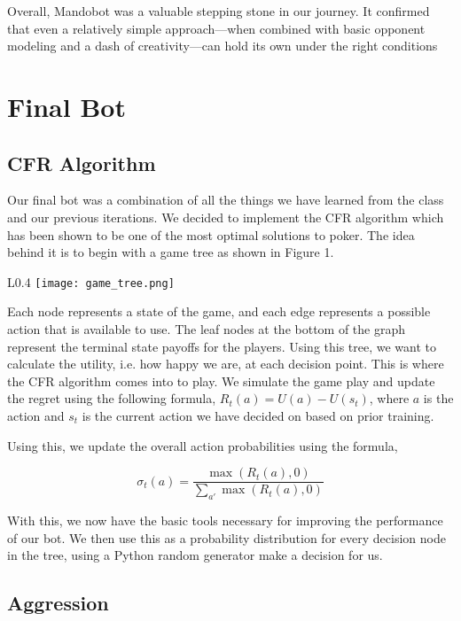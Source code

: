 \documentclass{article}
\begin{document}
    Overall, Mandobot was a valuable stepping stone in our journey. It confirmed that even a relatively simple approach—when combined with basic opponent modeling and a dash of creativity—can hold its own under the right conditions

    \pagebreak
    
    \section*{Final Bot}
   
    \subsection*{CFR Algorithm}
    Our final bot was a combination of all the things we have learned from the class and our previous iterations. We decided to implement the CFR algorithm which has been shown to be one of the most optimal solutions to poker. The idea behind it is to begin with a game tree as shown in Figure 1. 

    \begin{wrapfigure}{L}{0.4\textwidth}
    \centering
    \captionsetup{justification=centering,margin=2cm}
    \texttt{[image: game\_tree.png]}
    \caption{\label{fig:tree_diagram}}
    \end{wrapfigure}

    Each node represents a state of the game, and each edge represents a possible action that is available to use. The leaf nodes at the bottom of the graph represent the terminal state payoffs for the players. Using this tree, we want to calculate the utility, i.e. how happy we are, at each decision point. This is where the CFR algorithm comes into to play. We simulate the game play and update the regret using the following formula, $R_t(a) = U(a) - U(s_t)$, where $a$ is the action and $s_t$ is the current action we have decided on based on prior training. 
  

    Using this, we update the overall action probabilities using the formula, 

    \[\sigma_t(a) = \frac{\max{(R_t(a),0)}}{\sum_{a'}\max{(R_t(a),0)}}\]

    With this, we now have the basic tools necessary for improving the performance of our bot. We then use this as a probability distribution for every decision node in the tree, using a Python random generator make a decision for us. 

    \subsection*{Aggression}
\end{document}
